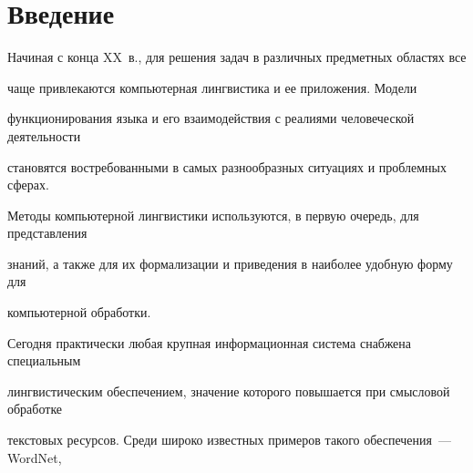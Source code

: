 












      \thispagestyle{headings}





      


            \label{st\stat}


            


            \vspace*{-14pt}





      


     \section{Введение}


     


   Начиная с конца XX~в., для решения задач в различных предметных областях все 


чаще привлекаются компьютерная лингвистика и ее приложения. Модели 


функционирования языка и его взаимодействия с реалиями человеческой деятельности 


становятся востребованными в самых разнообразных ситуациях и проблемных сферах. 


Методы компьютерной лингвистики используются, в первую очередь, для представления 


знаний, а также для их формализации и приведения в наиболее удобную форму для 


компьютерной обработки. 


   


   Сегодня практически любая крупная информационная система снабжена специальным 


лингвистическим обеспечением, значение которого повышается при смысловой обработке 


текстовых ресурсов. Среди широко известных примеров такого обеспечения~--- WordNet, 


